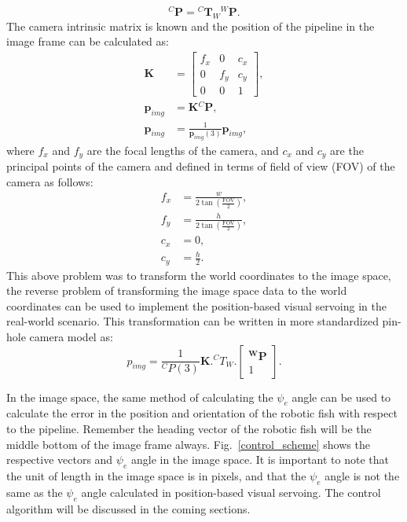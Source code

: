 \documentclass[pdflatex,sn-mathphys-num]{sn-jnl}
\theoremstyle{thmstyleone}%
\begin{document}
\begin{equation*}
    {}^C\mathbf{P} = {}^C\mathbf{T}_{W} {}^W\mathbf{P}.
\end{equation*}
The camera intrinsic matrix is known and the position of the pipeline in the image frame can be calculated as:
\begin{equation*}
    \begin{aligned}
        \mathbf{K} &= 
        \begin{bmatrix}
            f_x & 0 & c_x \\
            0 & f_y & c_y \\
            0 & 0 & 1
        \end{bmatrix}, \\ 
        \mathbf{p}_{img} &= \mathbf{K} {}^C\mathbf{P}, \\
        \mathbf{p}_{img} &= \frac{1}{\mathbf{p}_{img}(3)} \mathbf{p}_{img},
    \end{aligned}
\end{equation*}
where $f_x$ and $f_y$ are the focal lengths of the camera, and $c_x$ and $c_y$ are the principal points of the camera and defined in terms of field of view (FOV) of the camera as follows:
\begin{equation*}
    \begin{aligned}
        f_x &= \frac{w}{2 \tan(\frac{\text{FOV}}{2})}, \\
        f_y &= \frac{h}{2 \tan(\frac{\text{FOV}}{2})}, \\
        c_x &= 0, \\
        c_y &= \frac{h}{2}.
    \end{aligned}
\end{equation*}
This above problem was to transform the world coordinates to the image space, the reverse problem of transforming the image space data to the world coordinates can be used to implement the position-based visual servoing in the real-world scenario. This transformation can be written in more standardized pin-hole camera model as:
\begin{equation}
    p_{img} = \frac{1}{^CP(3)} \mathbf{K} . ^CT_W. \begin{bmatrix}
        \mathbf{^WP} \\
        1
    \end{bmatrix}.
 \end{equation}
\par In the image space, the same method of calculating the $\psi_e$ angle can be used to calculate the error in the position and orientation of the robotic fish with respect to the pipeline. Remember the heading vector of the robotic fish will be the middle bottom of the image frame always. Fig.~\ref{control_scheme} shows the respective vectors and $\psi_e$ angle in the image space. It is important to note that the unit of length in the image space is in pixels, and that the $\psi_e$ angle is not the same as the $\psi_e$ angle calculated in position-based visual servoing. The control algorithm will be discussed in the coming sections.
\end{document}
